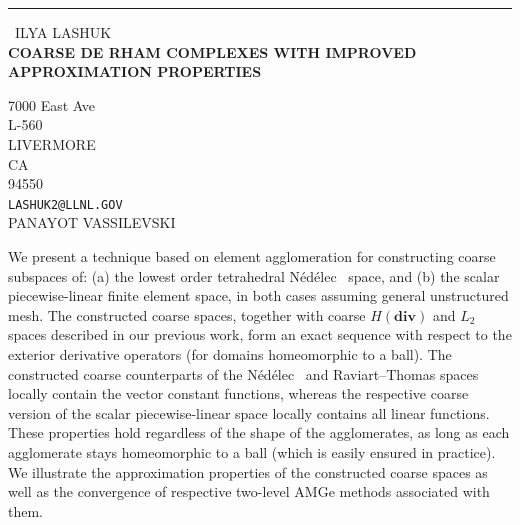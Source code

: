\documentclass{report}
\begin{document}
\begin{center}
\rule{6in}{1pt} \
{\large ILYA LASHUK \\
{\bf COARSE DE RHAM COMPLEXES WITH IMPROVED APPROXIMATION PROPERTIES}}

7000 East Ave \\ L-560 \\ LIVERMORE \\ CA \\ 94550
\\
{\tt LASHUK2@LLNL.GOV}\\
PANAYOT VASSILEVSKI\end{center}

\newcommand{\dvg}{\mathbf{div}}
\newcommand{\curl}{\mathbf{curl}}
\def\Nedelec{N\'ed\'elec}

We present a technique based on element agglomeration for constructing
coarse subspaces of:
(a) the lowest order tetrahedral \Nedelec~ space, and (b) the scalar
piecewise-linear finite element
space, in both cases assuming general unstructured mesh. The constructed
coarse spaces, together with coarse $H(\dvg)$ and $L_2$ spaces described
in our previous work,
form an exact sequence with respect to the exterior
derivative operators (for domains homeomorphic to a ball). The constructed
coarse counterparts of the \Nedelec~ and Raviart--Thomas spaces locally
contain the vector constant functions,
whereas the respective coarse version of the scalar piecewise-linear
space locally contains all linear functions.
These properties hold regardless of the shape of the agglomerates, as
long as each agglomerate stays
homeomorphic to a ball (which is easily ensured in practice).
We illustrate the approximation properties of the constructed coarse
spaces as well as the convergence
of respective two-level AMGe methods associated with them.
\end{document}

